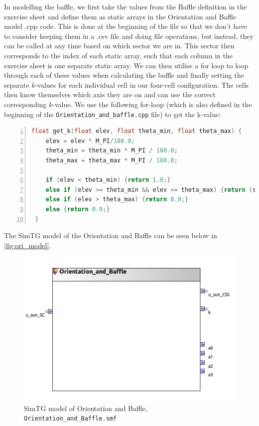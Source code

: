 In modelling the baffle, we first take the values from the Baffle definition in the exercise sheet and define them as static arrays in the Orientation and Baffle model .cpp code. This is done at the beginning of the file so that we don't have to consider keeping them in a .csv file and doing file operations, but instead, they can be called at any time based on which sector we are in. This sector then corresponds to the index of each static array, such that each column in the exercise sheet is one separate static array. We can then utilise a for loop to loop through each of these values when calculating the baffle and finally setting the separate $k$-values for each individual cell in our four-cell configuration. The cells then know themselves which axis they are on and can use the correct corresponding $k$-value. We use the following for-loop (which is also defined in the beginning of the \texttt{Orientation\_and\_baffle.cpp} file) to get the k-value:
\begin{lstlisting}[frame=single, numbers=left, basicstyle=\tiny, language=c++]
float get_k(float elev, float theta_min, float theta_max) {
    elev = elev * M_PI/180.0;
    theta_min = theta_min * M_PI / 180.0;
    theta_max = theta_max * M_PI / 180.0;
    
    if (elev < theta_min) {return 1.0;}
    else if (elev >= theta_min && elev <= theta_max) {return (sin(theta_max-theta_min));}
    else if (elev > theta_max) {return 0.0;}
    else {return 0.0;}
 }
\end{lstlisting}




The SimTG model of the Orientation and Baffle can be seen below in \autoref{fig:ori_model}.


\begin{figure}[H]
    \centering
    \includegraphics[width=0.6\linewidth]{doc//Graphics/ori_model.png}
    \caption{SimTG model of Orientation and Baffle, \texttt{Orientation\_and\_Baffle.smf}}
    \label{fig:ori_model}
\end{figure}




